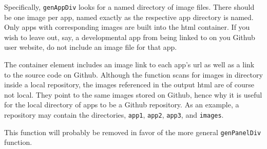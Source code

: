 \documentclass{article}\usepackage[]{graphicx}\usepackage[]{color}
\begin{document}
Specifically, \texttt{genAppDiv} looks for a named directory of image files.
There should be one image per app, named exactly as the respective app directory is named.
Only apps with corresponding images are built into the html container.
If you wish to leave out, say, a developmental app from being linked to on you Github user website, do not include an image file for that app.

The container element includes an image link to each app's url as well as a link to the source code on Github.
Although the function scans for images in directory inside a local repository, the images referenced in the output html are of course not local.
They point to the same images stored on Github, hence why it is useful for the local directory of apps to be a Github repository.
As an example, a repository may contain the directories, \texttt{app1}, \texttt{app2}, \texttt{app3}, and \texttt{images}.

This function will probably be removed in favor of the more general \texttt{genPanelDiv} function.
\end{document}
